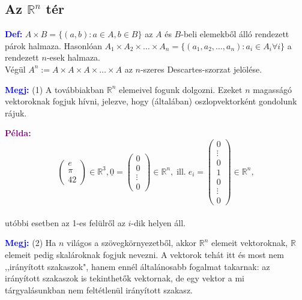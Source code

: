 \documentclass[../szamtud.tex]{subfiles}
\begin{document}
    
    \subsection{Az $\mathbb{R}^n$ tér}

        \textcolor{blue}{\textbf{Def:}} $A \times B = \{(a,b):a\in A,b\in B\}$ az $A$ és $B$-beli elemekből álló rendezett párok halmaza. Hasonlóan $A_1 \times A_2 \times \dots \times A_n = \{(a_1,a_2,\dots,a_n):a_i\in A_i \forall i\}$ a rendezett $n$-esek halmaza. \\ Végül $A^n := A \times A \times A \times \dots \times A$ az $n$-szeres Descartes-szorzat jelölése.

        \textcolor{blue}{\textbf{Megj:}} (1) A továbbiakban $\mathbb{R}^n$ elemeivel fogunk dolgozni. Ezeket $n$ magasságó vektoroknak fogjuk hívni, jelezve, hogy (általában) oszlopvektorként gondolunk rájuk.

        \textcolor{purple}{\textbf{Példa:}}
        \[
            \begin{pmatrix}
                e \\
                \pi \\
                42 
            \end{pmatrix}  
            \in \mathbb{R}^3, \underline{0} = 
            \begin{pmatrix}
                0 \\
                0 \\
                \vdots \\
                0 
            \end{pmatrix}  
            \in \mathbb{R}^n,\; \textrm{ill.}\; e_i = 
            \begin{pmatrix}
                0 \\
                \vdots \\
                0 \\
                1 \\
                0 \\
                \vdots \\
                0 
            \end{pmatrix} 
            \in \mathbb{R}^n,\] \\ utóbbi esetben az 1-es felülről az $i$-dik helyen áll.
            
        \textcolor{blue}{\textbf{Megj:}} (2) Ha $n$ világos a szövegkörnyezetből, akkor $\mathbb{R}^n$ elemeit vektoroknak, $\mathbb{R}$ elemeit pedig skalároknak fogjuk nevezni. A vektorok tehát itt és most nem ,,irányított szakaszok", hanem ennél általánosabb fogalmat takarnak: az irányított szakaszok is tekinthetők vektornak, de egy vektor a mi tárgyalásunkban nem feltétlenül irányított szakasz.
\end{document}
